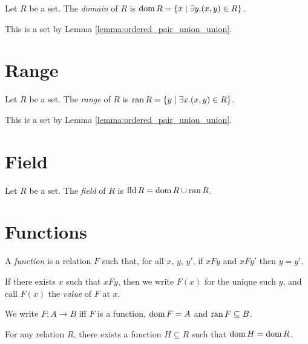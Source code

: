 \begin{definition}
    Let $R$ be a set. The \emph{domain} of $R$ is $\operatorname{dom} R = \{ x \mid \exists y. (x,y) \in R \}$.

    This is a set by Lemma \ref{lemma:ordered_pair_union_union}.
\end{definition}

\section{Range}

\begin{definition}
    Let $R$ be a set. The \emph{range} of $R$ is $\operatorname{ran} R = \{ y \mid \exists x. (x,y) \in R \}$.

    This is a set by Lemma \ref{lemma:ordered_pair_union_union}.
\end{definition}

\section{Field}

\begin{definition}
    Let $R$ be a set. The \emph{field} of $R$ is
    $\operatorname{fld} R = \operatorname{dom} R \cup \operatorname{ran} R$.
\end{definition}

\section{Functions}

\begin{definition}
A \emph{function} is a relation $F$ such that, for all $x$, $y$, $y'$, if $xFy$ and $xFy'$ then $y = y'$.

If there exists $x$ such that $xFy$, then we write $F(x)$ for the unique such $y$, and call $F(x)$
the \emph{value} of $F$ at $x$.
\end{definition}

\begin{definition}
    We write $F : A \rightarrow B$ iff $F$ is a function, $\operatorname{dom} F = A$
    and $\operatorname{ran} F \subseteq B$.
\end{definition}

\begin{axiom}
    For any relation $R$, there exists a function $H \subseteq R$ such that 
    $\operatorname{dom} H = \operatorname{dom} R$.
\end{axiom}

